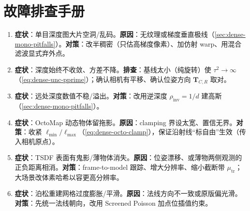 \section*{故障排查手册}
\begin{enumerate}
  \item \textbf{症状}：单目深度图大片空洞/乱码。\textbf{原因}：无纹理或梯度垂直极线（\cref{sec:dense-mono-pitfalls}）。\textbf{对策}：改半稠密（只估高梯度像素）、加仿射 warp、用混合滤波显式弃外点。
  \item \textbf{症状}：深度始终不收敛、方差不降。\textbf{排查}：基线太小（纯旋转）使 $\tau^2\to\infty$（\cref{eq:dense-unc-pprime}）；确认相机有平移、确认位姿方向 $\mathbf{T}_{C,R}$ 取对。
  \item \textbf{症状}：远处深度数值不稳/溢出。\textbf{对策}：改用逆深度 $\rho_{\mathrm{inv}}=1/d$ 建高斯（\cref{sec:dense-mono-pitfalls}）。
  \item \textbf{症状}：OctoMap 动态物体留拖影。\textbf{原因}：clamping 界设太宽、置信无界。\textbf{对策}：收紧 $\ell_{\min}/\ell_{\max}$（\cref{eq:dense-octo-clamp}），保证沿射线“标自由”生效（传入相机原点）。
  \item \textbf{症状}：TSDF 表面有鬼影/薄物体消失。\textbf{原因}：位姿漂移、或薄物两侧观测的正负距离相消。\textbf{对策}：frame-to-model 跟踪、增大分辨率、缩小截断带 $\mu_{\mathrm{tr}}$；大场景改体素哈希以容更高分辨率。
  \item \textbf{症状}：泊松重建网格过度膨胀/平滑。\textbf{原因}：法线方向不一致或原版偏光滑。\textbf{对策}：先统一法线朝向，改用 Screened Poisson 加点位插值约束。
\end{enumerate}
